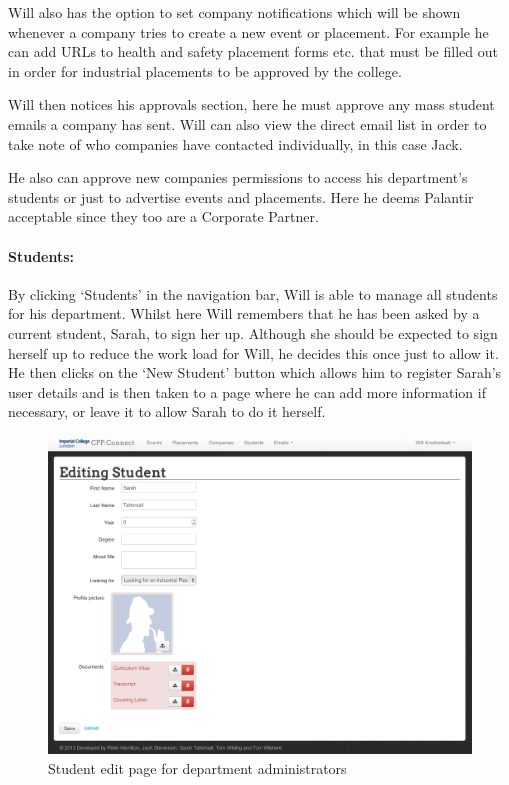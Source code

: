     Will also has the option to set company notifications which will be shown whenever a company tries to create a new event or placement. For example he can add URLs to health and safety placement forms etc. that must be filled out in order for industrial placements to be approved by the college. 

    Will then notices his approvals section, here he must approve any mass student emails a company has sent. Will can also view the direct email list in order to take note of who companies have contacted individually, in this case Jack.

    He also can approve new companies permissions to access his department's students or just to advertise events and placements. Here he deems Palantir acceptable since they too are a Corporate Partner.

  \paragraph{Students:}
    By clicking `Students' in the navigation bar, Will is able to manage all students for his department.
    Whilst here Will remembers that he has been asked by a current student, Sarah, to sign her up. Although she should be expected to sign herself up to reduce the work load for Will, he decides this once just to allow it.
    He then clicks on the `New Student' button which allows him to register Sarah's user details and is then taken to a page where he can add more information if necessary, or leave it to allow Sarah to do it herself.
    \begin{figure}[H]\centering
    \includegraphics[scale=0.3]{images/user_experiences/admin/admin_student_edit}
    \caption{Student edit page for department administrators}
    \end{figure}


